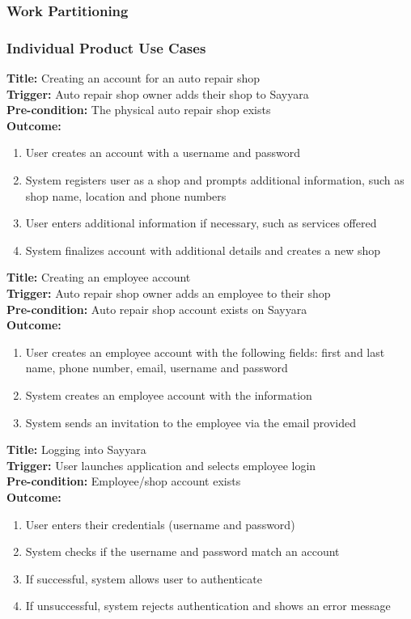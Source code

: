 \documentclass[12pt]{article}
\begin{document}
\subsubsection{Work Partitioning}

\subsubsection{Individual Product Use Cases}
\textbf{Title:} Creating an account for an auto repair shop\\
\textbf{Trigger:} Auto repair shop owner adds their shop to Sayyara\\
\textbf{Pre-condition:} The physical auto repair shop exists\\
\textbf{Outcome:}
\begin{enumerate}
	\item User creates an account with a username and password
	\item System registers user as a shop and prompts additional information, such as shop name, location and
	      phone numbers
	\item User enters additional information if necessary, such as services offered
	\item System finalizes account with additional details and creates a new shop
\end{enumerate}

\textbf{Title:} Creating an employee account\\
\textbf{Trigger:} Auto repair shop owner adds an employee to their shop\\
\textbf{Pre-condition:} Auto repair shop account exists on Sayyara\\
\textbf{Outcome:}
\begin{enumerate}
	\item User creates an employee account with the following fields: first and last name, phone number,
	      email, username and password
	\item System creates an employee account with the information
	\item System sends an invitation to the employee via the email provided
\end{enumerate}

\textbf{Title:} Logging into Sayyara\\
\textbf{Trigger:} User launches application and selects employee login\\
\textbf{Pre-condition:} Employee/shop account exists\\
\textbf{Outcome:}
\begin{enumerate}
	\item User enters their credentials (username and password)
	\item System checks if the username and password match an account
	\item If successful, system allows user to authenticate
	\item If unsuccessful, system rejects authentication and shows an error message
\end{enumerate}
\end{document}
